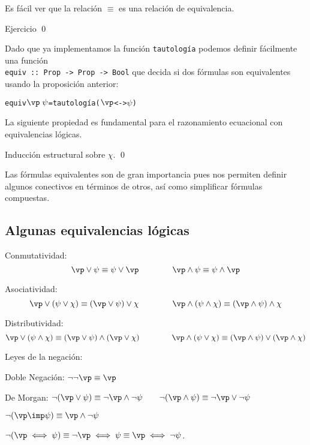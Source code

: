 \documentclass[11pt,letterpaper]{article}
\begin{document}
Es f\'acil ver que la relaci\'on $\equiv$ es una relaci\'on de equivalencia.



\proof
Ejercicio
\qed

\espc
Dado que ya implementamos la funci\'on {\tt tautolog\'ia} podemos definir 
f\'acilmente una funci\'on \\
\verb~equiv :: Prop -> Prop -> Bool~ que 
decida si dos f\'ormulas son equivalentes usando la proposici\'on anterior:
\begin{alltt}
equiv \(\vp\; \psi\) = tautolog\'ia (\(\vp\) <-> \(\psi\))
\end{alltt}


La siguiente propiedad es fundamental para el razonamiento ecuacional con 
equivalencias l\'ogicas.


\proof
Inducci\'on estructural sobre $\chi$.
\qed

\espc

Las f\'ormulas equivalentes son de gran importancia pues nos permiten definir
algunos conectivos en t\'erminos de otros, as\'i como simplificar f\'ormulas
compuestas.


\subsection{Algunas equivalencias l\'ogicas}

\bi
\item Conmutatividad:
$$ \vp \lor \psi \equiv \psi \lor \vp 
\qquad \qquad 
\vp \land \psi \equiv \psi \land \vp $$

\item Asociatividad:
$$ \vp \lor( \psi \lor \chi )\equiv(\vp \lor \psi )\lor \chi  
\qquad \qquad 
\vp \land( \psi \land \chi)\equiv(\vp \land \psi )\land \chi $$

\item Distributividad:
$$\vp \lor( \psi \land \chi )\equiv(\vp \lor \psi )\land(\vp \lor \chi )
\qquad \qquad 
\vp \land( \psi \lor \chi )\equiv(\vp \land \psi )\lor(\vp \land \chi ) $$

\item Leyes de la negaci\'on:
\bi
\item Doble Negaci\'on: $\lnot\lnot \vp \equiv \vp $
\item De Morgan: $\lnot(\vp \lor \psi )\equiv \lnot \vp \land\lnot \psi \qquad 
\lnot(\vp \land \psi )\equiv \lnot \vp \lor\lnot \psi $ 
\item $\lnot(\vp \imp \psi )\equiv \vp \land\lnot \psi $ 
\item $\lnot(\vp \iff \psi )\equiv\lnot \vp \iff \psi \equiv \vp \iff\lnot \psi 
$. 
\ei
\end{document}
